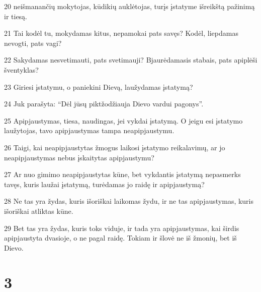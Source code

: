 \par 20 neišmanančių mokytojas, kūdikių auklėtojas, turįs įstatyme išreikštą pažinimą ir tiesą. 
\par 21 Tai kodėl tu, mokydamas kitus, nepamokai pats savęs? Kodėl, liepdamas nevogti, pats vagi? 
\par 22 Sakydamas nesvetimauti, pats svetimauji? Bjaurėdamasis stabais, pats apiplėši šventyklas? 
\par 23 Giriesi įstatymu, o paniekini Dievą, laužydamas įstatymą? 
\par 24 Juk parašyta: “Dėl jūsų piktžodžiauja Dievo vardui pagonys”. 
\par 25 Apipjaustymas, tiesa, naudingas, jei vykdai įstatymą. O jeigu esi įstatymo laužytojas, tavo apipjaustymas tampa neapipjaustymu. 
\par 26 Taigi, kai neapipjaustytas žmogus laikosi įstatymo reikalavimų, ar jo neapipjaustymas nebus įskaitytas apipjaustymu? 
\par 27 Ar nuo gimimo neapipjaustytas kūne, bet vykdantis įstatymą nepasmerks tavęs, kuris laužai įstatymą, turėdamas jo raidę ir apipjaustymą? 
\par 28 Ne tas yra žydas, kuris išoriškai laikomas žydu, ir ne tas apipjaustymas, kuris išoriškai atliktas kūne. 
\par 29 Bet tas yra žydas, kuris toks viduje, ir tada yra apipjaustymas, kai širdis apipjaustyta dvasioje, o ne pagal raidę. Tokiam ir šlovė ne iš žmonių, bet iš Dievo.


\chapter{3}


